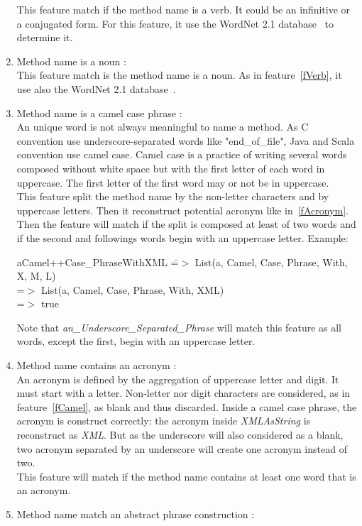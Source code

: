 \documentclass[12pt]{article}
\newcommand{\code}[1]{{\fontfamily{phv}\selectfont \small{\begin{tabbing} #1 \end{tabbing}}}}
\begin{document}
\begin{enumerate}
	This feature match if the method name is a verb. It could be an infinitive or a conjugated form. For this feature, it use the WordNet 2.1 database~\cite{wordNet} to determine it.
\item Method name is a noun :\\
	This feature match is the method name is a noun. As in feature~\ref{fVerb}, it use also the WordNet 2.1 database~\cite{wordNet}.
\item Method name is a camel case phrase : \label{fCamel}\\
	An unique word is not always meaningful to name a method. As C convention use underscore-separated words like "end\_of\_file", Java and Scala convention use camel case. Camel case is a practice of writing several words composed without white space but with the first letter of each word in uppercase. The first letter of the first word may or not be in uppercase.\\
This feature split the method name by the non-letter characters and by uppercase letters. Then it reconstruct potential acronym like in~\ref{fAcronym}. Then the feature will match if the split is composed at least of two words and if the second and followings words begin with an uppercase letter. Example:
\code{aCamel++Case\_PhraseWithXML \= =$>$ List(a, Camel, Case, Phrase, With, X, M, L)\\
\>=$>$ List(a, Camel, Case, Phrase, With, XML)\\
\>=$>$ true
}
Note that \textit{an\_Underscore\_Separated\_Phrase} will match this feature as all words, except the first, begin with an uppercase letter.
\item Method name contains an acronym :\label{fAcronym}\\
	An acronym is defined by the aggregation of uppercase letter and digit. It must start with a letter. Non-letter nor digit characters are considered, as in feature~\ref{fCamel}, as blank and thus discarded. Inside a camel case phrase, the acronym is construct correctly: the acronym inside \textit{XMLAsString} is reconstruct as \textit{XML}. But as the underscore will also considered as a blank, two acronym separated by an underscore will create one acronym instead of two.\\
This feature will match if the method name contains at least one word that is an acronym.
\item Method name match an abstract phrase construction : \\


\end{enumerate}
\end{document}
